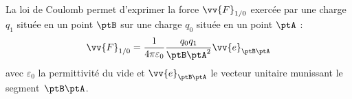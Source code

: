 
\finEntrainement






\newpage









\hauteurLargeurCadreReponse		{6mm}{3cm}
\typeEntrainement				{} %
\initialisationEntrainement

                                \initialisationPartieGauche %
% 

La loi de Coulomb permet d'exprimer la force $\vv{F}_{1/0}$ exercée par une charge $q_1$ située en un point $\ptB$ sur une charge $q_0$ située en un point $\ptA$ :
\[
	\vv{F}_{1/0} = \frac{1}{4\pi\varepsilon_0}\frac{q_0 q_1}{{\ptB\ptA}^2}\vv{e}_{\ptB\ptA}
\]
avec $\varepsilon_0$ la permittivité du vide et $\vv{e}_{\ptB\ptA}$ le vecteur unitaire munissant le segment~$\ptB\ptA$.


